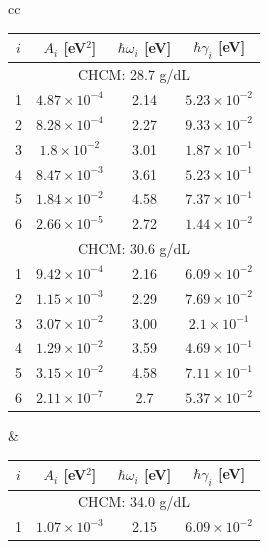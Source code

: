 \begin{table}[h!]
	\centering
	
	\begin{tabular}{cc}
		\begin{minipage}{0.45\textwidth}
			\centering
			{
			
				\arrayrulecolor{black}
			\begin{tabular}{cccc}
			\hline
				$i$ & $A_i$ [eV$^2$] & $\hbar\omega_i$ [eV] & $\hbar\gamma_i$ [eV] \\
				\hline
				\multicolumn{4}{c}{CHCM: 28.7 g/dL} \\
				\hline
				1 & $4.87 \times 10^{-4}$ & 2.14 & $5.23 \times 10^{-2}$ \\
				2 & $8.28 \times 10^{-4}$ & 2.27 & $9.33 \times 10^{-2}$ \\
				3 & $1.8 \times 10^{-2}$ & 3.01 & $1.87 \times 10^{-1}$ \\
				4 & $8.47 \times 10^{-3}$ & 3.61 & $5.23 \times 10^{-1}$ \\
				5 & $1.84 \times 10^{-2}$ & 4.58 & $7.37 \times 10^{-1}$ \\
				6 & $2.66 \times 10^{-5}$ & 2.72 & $1.44 \times 10^{-2}$ \\
				\hline
				\multicolumn{4}{c}{CHCM: 30.6 g/dL} \\
				\hline
				1 & $9.42 \times 10^{-4}$ & 2.16 & $6.09 \times 10^{-2}$ \\
				2 & $1.15 \times 10^{-3}$ & 2.29 & $7.69 \times 10^{-2}$ \\
				3 & $3.07 \times 10^{-2}$ & 3.00 & $2.1 \times 10^{-1}$ \\
				4 & $1.29 \times 10^{-2}$ & 3.59 & $4.69 \times 10^{-1}$ \\
				5 & $3.15 \times 10^{-2}$ & 4.58 & $7.11 \times 10^{-1}$ \\
				6 & $2.11 \times 10^{-7}$ & 2.7 & $5.37 \times 10^{-2}$ \\
				\hline
			\end{tabular}
		}
		\end{minipage}
		&
		\begin{minipage}{0.45\textwidth}
			\centering
			\begin{tabular}{cccc}
				\hline
				$i$ & $A_i$ [eV$^2$] & $\hbar\omega_i$ [eV] & $\hbar\gamma_i$ [eV] \\
				\hline
				\multicolumn{4}{c}{CHCM: 34.0 g/dL} \\
				\hline
				1 & $1.07 \times 10^{-3}$ & 2.15 & $6.09 \times 10^{-2}$ \\

\end{tabular}
\end{minipage}
\end{tabular}
\end{table}

